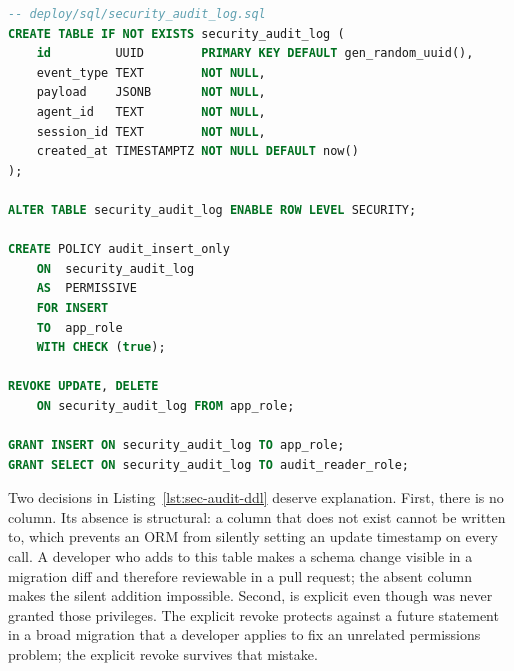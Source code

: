 \begin{lstlisting}[language=sql,
  caption={security\_audit\_log DDL with INSERT-only row-security policy},
  label={lst:sec-audit-ddl}]
-- deploy/sql/security_audit_log.sql
CREATE TABLE IF NOT EXISTS security_audit_log (
    id         UUID        PRIMARY KEY DEFAULT gen_random_uuid(),
    event_type TEXT        NOT NULL,
    payload    JSONB       NOT NULL,
    agent_id   TEXT        NOT NULL,
    session_id TEXT        NOT NULL,
    created_at TIMESTAMPTZ NOT NULL DEFAULT now()
);

ALTER TABLE security_audit_log ENABLE ROW LEVEL SECURITY;

CREATE POLICY audit_insert_only
    ON  security_audit_log
    AS  PERMISSIVE
    FOR INSERT
    TO  app_role
    WITH CHECK (true);

REVOKE UPDATE, DELETE
    ON security_audit_log FROM app_role;

GRANT INSERT ON security_audit_log TO app_role;
GRANT SELECT ON security_audit_log TO audit_reader_role;
\end{lstlisting}

Two decisions in Listing~\ref{lst:sec-audit-ddl} deserve explanation.
First, there is no  column. Its absence is
structural: a column that does not exist cannot be written to, which
prevents an ORM from silently setting an update timestamp on every
 call. A developer who adds  to this
table makes a schema change visible in a migration diff and therefore
reviewable in a pull request; the absent column makes the silent
addition impossible. Second,  is explicit
even though  was never granted those privileges. The
explicit revoke protects against a future  statement in
a broad migration that a developer applies to fix an unrelated
permissions problem; the explicit revoke survives that mistake.

